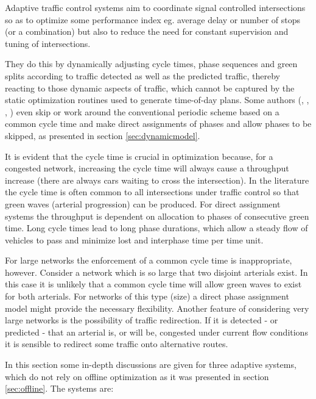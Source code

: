 \label{sec:adaptive_cooperation}

Adaptive traffic control systems aim to coordinate signal controlled
intersections so as to optimize some performance index eg. average
delay or number of stops (or a combination) but also to reduce the
need for constant supervision and tuning of intersections.

They do this by dynamically adjusting cycle times, phase sequences and
green splits according to traffic detected as well as the predicted
traffic, thereby reacting to those dynamic aspects of traffic,
which cannot be captured by the static optimization routines used to
generate time-of-day plans. Some authors (\cite{1}, \cite{44},
\cite{46},
\cite{scoot2004}) even skip or work around the conventional periodic
scheme based on a common cycle time and make direct assignments of
phases and allow phases to be skipped, as presented in section
\ref{sec:dynamicmodel}.

It is evident that the cycle time is crucial in optimization because,
for a congested network, increasing the cycle time will always cause a
throughput increase (there are always cars waiting to cross the
intersection). In the literature the cycle time is often common to
all intersections under traffic control so that green waves (arterial
progression) can be produced. For direct assignment systems the
throughput is dependent on allocation to phases of consecutive green
time. Long cycle times lead to long phase durations, which allow a
steady flow of vehicles to pass and minimize lost and interphase time
per time unit.

For large networks the enforcement of a common cycle time is
inappropriate, however. Consider a network which is so large that two
disjoint arterials exist. In this case it is unlikely that a common
cycle time will allow green waves to exist for both arterials. For
networks of this type (size) a direct phase assignment model might
provide the necessary flexibility. Another feature of considering very
large networks is the possibility of traffic redirection. If it is
detected - or predicted - that an arterial is, or will be, congested
under current flow conditions it is sensible to redirect some traffic
onto alternative routes.

In this section some in-depth discussions are given for three adaptive
systems, which do not rely on offline optimization as it was presented
in section \ref{sec:offline}. The systems are:

